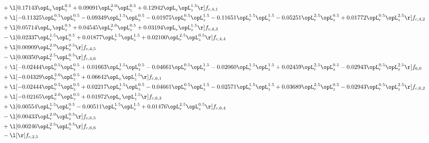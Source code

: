 \begin{alignat}{2}
& + \l[  0.17143 \opL_r \opL_z^{0.5} +  0.09091 \opL_r^{2.0} \opL_z^{0.5} +  0.12942 \opL_r \opL_z^{1.5}  \r] f_{c,4,1} \nonumber \\ 
& + \l[  -0.11325 \opL_r^{0.5} \opL_z^{0.5}   -0.09349 \opL_r^{1.5} \opL_z^{0.5}   -0.01975 \opL_r^{0.5} \opL_z^{1.5}   -0.11651 \opL_r^{1.5} \opL_z^{1.5}   -0.05251 \opL_r^{2.5} \opL_z^{0.5} +  0.01772 \opL_r^{0.5} \opL_z^{2.5}  \r] f_{c,4,2} \nonumber \\ 
& + \l[  0.05714 \opL_r \opL_z^{0.5} +  0.04545 \opL_r^{2.0} \opL_z^{0.5} +  0.03194 \opL_r \opL_z^{1.5}  \r] f_{c,4,3} \nonumber \\ 
& - \l[  0.02337 \opL_r^{1.5} \opL_z^{0.5} +  0.01877 \opL_r^{1.5} \opL_z^{1.5} +  0.02100 \opL_r^{2.5} \opL_z^{0.5}  \r] f_{c,4,4} \nonumber \\ 
& + \l[  0.00909 \opL_r^{2.0} \opL_z^{0.5}  \r] f_{c,4,5} \nonumber \\ 
& - \l[  0.00350 \opL_r^{2.5} \opL_z^{0.5}  \r] f_{c,4,6} \nonumber \\ 
& + \l[  -0.02444 \opL_r^{0.5} \opL_z^{0.5} +  0.01663 \opL_r^{1.5} \opL_z^{0.5}   -0.04661 \opL_r^{0.5} \opL_z^{1.5}   -0.02060 \opL_r^{1.5} \opL_z^{1.5} +  0.02459 \opL_r^{2.5} \opL_z^{0.5}   -0.02943 \opL_r^{0.5} \opL_z^{2.5}  \r] f_{6,0} \nonumber \\ 
& + \l[  -0.04329 \opL_r^{2.0} \opL_z^{0.5} +  0.06642 \opL_r \opL_z^{1.5}  \r] f_{c,6,1} \nonumber \\ 
& + \l[  -0.02444 \opL_r^{0.5} \opL_z^{0.5} +  0.02217 \opL_r^{1.5} \opL_z^{0.5}   -0.04661 \opL_r^{0.5} \opL_z^{1.5}   -0.02571 \opL_r^{1.5} \opL_z^{1.5} +  0.03689 \opL_r^{2.5} \opL_z^{0.5}   -0.02943 \opL_r^{0.5} \opL_z^{2.5}  \r] f_{c,6,2} \nonumber \\ 
& + \l[  -0.02165 \opL_r^{2.0} \opL_z^{0.5} +  0.01972 \opL_r \opL_z^{1.5}  \r] f_{c,6,3} \nonumber \\ 
& + \l[  0.00554 \opL_r^{1.5} \opL_z^{0.5}   -0.00511 \opL_r^{1.5} \opL_z^{1.5} +  0.01476 \opL_r^{2.5} \opL_z^{0.5}  \r] f_{c,6,4} \nonumber \\ 
& - \l[  0.00433 \opL_r^{2.0} \opL_z^{0.5}  \r] f_{c,6,5} \nonumber \\ 
& + \l[  0.00246 \opL_r^{2.5} \opL_z^{0.5}  \r] f_{c,6,6} \nonumber \\ 
& - \l[  \r] f_{c,2,5} \nonumber \\ 
\end{alignat} 


